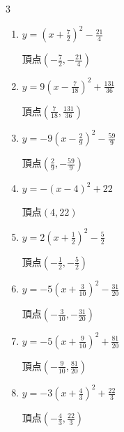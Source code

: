 \begin{multicols}{3}
\begin{enumerate}
  \item $\displaystyle y=\left( x+\frac{7}{2}\right)^{2}-\frac{21}{4}$

        $\displaystyle 頂点\left( -\frac{7}{2} , -\frac{21}{4} \right)$

  \item $\displaystyle y=9\left( x-\frac{7}{18}\right)^{2}+\frac{131}{36}$

        $\displaystyle 頂点\left( \frac{7}{18} , \frac{131}{36} \right)$

  \item $\displaystyle y=-9\left( x-\frac{2}{9}\right)^{2}-\frac{59}{9}$

        $\displaystyle 頂点\left( \frac{2}{9} , -\frac{59}{9} \right)$

  \item $\displaystyle y=-\left( x-4\right)^{2}+22$

        $\displaystyle 頂点\left( 4 , 22 \right)$

  \item $\displaystyle y=2\left( x+\frac{1}{2}\right)^{2}-\frac{5}{2}$

        $\displaystyle 頂点\left( -\frac{1}{2} , -\frac{5}{2} \right)$

  \item $\displaystyle y=-5\left( x+\frac{3}{10}\right)^{2}-\frac{31}{20}$

        $\displaystyle 頂点\left( -\frac{3}{10} , -\frac{31}{20} \right)$

  \item $\displaystyle y=-5\left( x+\frac{9}{10}\right)^{2}+\frac{81}{20}$

        $\displaystyle 頂点\left( -\frac{9}{10} , \frac{81}{20} \right)$

  \item $\displaystyle y=-3\left( x+\frac{4}{3}\right)^{2}+\frac{22}{3}$

        $\displaystyle 頂点\left( -\frac{4}{3} , \frac{22}{3} \right)$

\end{enumerate}
\end{multicols}
